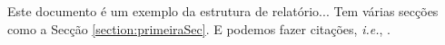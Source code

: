 
Este documento é um exemplo da estrutura de relatório... Tem várias secções como
a Secção \ref{section:primeiraSec}.  E podemos fazer citações, {\it i.e.}, \citep{ref1}.